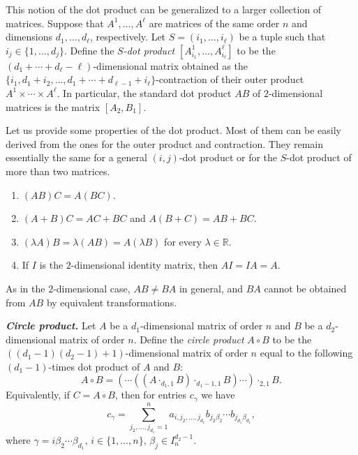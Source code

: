 \documentclass[a4paper]{article}
\begin{document}
This notion of the dot product can be generalized to a larger collection of matrices.  Suppose that  $A^1, \ldots, A^\ell$ are matrices  of the same order $n$ and dimensions $d_1, \ldots, d_\ell$, respectively. Let $S = (i_1, \ldots, i_\ell)$ be a tuple such that $i_j \in \{ 1, \ldots, d_j\}$. Define the \textit{$S$-dot product} $[A^1_{i_1}, \ldots, A^\ell_{i_\ell}]$ to be  the $(d_1 + \cdots + d_\ell - \ell)$-dimensional matrix  obtained as the $\{ i_1, d_1 + i_2, \ldots, d_1 + \cdots + d_{\ell-1} + i_\ell\}$-contraction of their outer product $A^1 \times \cdots \times A^\ell$. In particular, the standard dot product $AB$ of $2$-dimensional matrices is the matrix $[A_2, B_1]$.

Let us provide some properties of the dot product. Most of them can be easily derived from the ones for the outer product and contraction. They remain essentially the same for a general $(i,j)$-dot product or for the $S$-dot product of more than two matrices.  


\begin{utv} \label{dotprop}
\item 
\begin{enumerate}
\item $(A B) C = A  (B  C)$.
\item $(A + B)  C = A  C + B  C$ and $A (B + C) = AB + BC$. 
\item $(\lambda A)  B = \lambda (A  B) = A  (\lambda B)$ for every $\lambda \in \mathbb{R}$.
\item If  $I$ is the $2$-dimensional identity matrix, then  $A I = I A = A$.
\end{enumerate}
\end{utv}


As in the $2$-dimensional case,  $A B \neq B A$  in general, and $BA$ cannot be obtained from $AB$ by equivalent transformations. 


\textbf{\textit{Circle product.}}  Let $A$ be a $d_1$-dimensional matrix of order $n$ and $B$ be a $d_2$-dimensional matrix of order $n$. Define the \textit{circle product} $A \circ B$ to be the $((d_1 -1) (d_2 -1) +1)$-dimensional  matrix of order $n$ equal to the following $(d_1 -1)$-times dot product of $A$ and $B$:
 $$A \circ B = (\cdots((A \cdot_{d_1, 1}B) \cdot_{d_1 - 1, 1}B) \cdots) \cdot_{2, 1}B.$$
 Equivalently, if $C = A \circ B$, then for entries $c_{\gamma}$ we have
 $$c_{\gamma} = \sum\limits_{j_2, \ldots, j_{d_1} =1}^n a_{i, j_2, \ldots, j_{d_1}} b_{j_2 \beta_2} \cdots b_{j_{d_1} \beta_{d_1}}, $$
 where $\gamma = i \beta_2 \cdots \beta_{d_1}$, $i \in \{ 1, \ldots, n\}$, $\beta_{j} \in I_n^{d_2-1}$.
\end{document}
